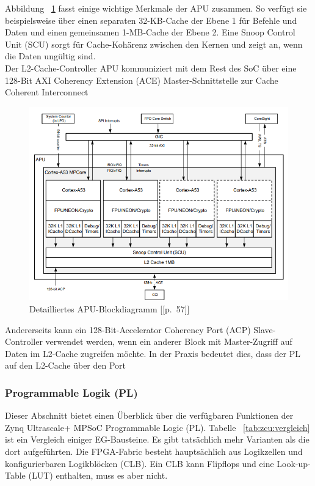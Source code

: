 Abbildung ~\ref{fig:zynqmp:apu} fasst einige wichtige Merkmale der APU zusammen. So verfügt sie beispielsweise über einen separaten 32-KB-Cache der Ebene 1 für Befehle und Daten und einen gemeinsamen 1-MB-Cache der Ebene 2. Eine Snoop Control Unit (SCU) sorgt für Cache-Kohärenz zwischen den Kernen und zeigt an, wenn die Daten ungültig sind.\\
Der L2-Cache-Controller APU kommuniziert mit dem Rest des SoC über eine 128-Bit AXI Coherency Extension (ACE) Master-Schnittstelle zur Cache Coherent Interconnect\\
\begin{figure}[H]
	\begin{center}
		\includegraphics[width=1\textwidth]{./images/apu.jpg}
	\end{center}
	\vspace{-5pt}
	\caption[Detailliertes APU-Blockdiagramm]{Detailliertes APU-Blockdiagramm [\cite{Xilinx2017}[p.~57]]} %
	\label{fig:zynqmp:apu}
	\vspace{-5pt}
\end{figure}
Andererseits kann ein 128-Bit-Accelerator Coherency Port (ACP) Slave-Controller verwendet werden, wenn ein anderer Block mit Master-Zugriff auf Daten im L2-Cache zugreifen möchte. In der Praxis bedeutet dies, dass der PL auf den L2-Cache über den Port %

\subsubsection{Programmable Logik (PL)}
Dieser Abschnitt bietet einen Überblick über die verfügbaren Funktionen der Zynq Ultrascale+ MPSoC Programmable Logic (PL). Tabelle ~\ref{tab:zcu:vergleich} ist ein Vergleich einiger EG-Bausteine. Es gibt tatsächlich mehr Varianten als die dort aufgeführten. Die FPGA-Fabric besteht hauptsächlich aus Logikzellen und konfigurierbaren Logikblöcken (CLB). Ein CLB kann Flipflops und eine Look-up-Table (LUT) enthalten, muss es aber nicht.\\

